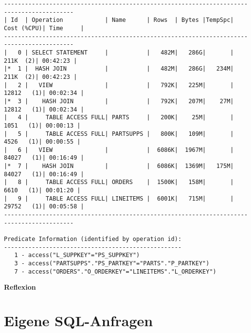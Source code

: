 \documentclass[10pt]{article}
\begin{document}
\begin{lstlisting}[style=queryexecutionplan]
------------------------------------------------------------------------------------------
| Id  | Operation            | Name      | Rows  | Bytes |TempSpc| Cost (%CPU)| Time     |
------------------------------------------------------------------------------------------
|   0 | SELECT STATEMENT     |           |   482M|   286G|       |   211K  (2)| 00:42:23 |
|*  1 |  HASH JOIN           |           |   482M|   286G|   234M|   211K  (2)| 00:42:23 |
|   2 |   VIEW               |           |   792K|   225M|       | 12812   (1)| 00:02:34 |
|*  3 |    HASH JOIN         |           |   792K|   207M|    27M| 12812   (1)| 00:02:34 |
|   4 |     TABLE ACCESS FULL| PARTS     |   200K|    25M|       |  1051   (1)| 00:00:13 |
|   5 |     TABLE ACCESS FULL| PARTSUPPS |   800K|   109M|       |  4526   (1)| 00:00:55 |
|   6 |   VIEW               |           |  6086K|  1967M|       | 84027   (1)| 00:16:49 |
|*  7 |    HASH JOIN         |           |  6086K|  1369M|   175M| 84027   (1)| 00:16:49 |
|   8 |     TABLE ACCESS FULL| ORDERS    |  1500K|   158M|       |  6610   (1)| 00:01:20 |
|   9 |     TABLE ACCESS FULL| LINEITEMS |  6001K|   715M|       | 29752   (1)| 00:05:58 |
------------------------------------------------------------------------------------------

Predicate Information (identified by operation id):
---------------------------------------------------
   1 - access("L_SUPPKEY"="PS_SUPPKEY")
   3 - access("PARTSUPPS"."PS_PARTKEY"="PARTS"."P_PARTKEY")
   7 - access("ORDERS"."O_ORDERKEY"="LINEITEMS"."L_ORDERKEY")
\end{lstlisting}
\textbf{Reflexion} \newline

\section{Eigene SQL-Anfragen}

\end{document}
